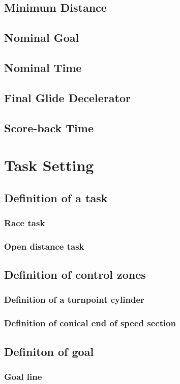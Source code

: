 \documentclass{article}
\begin{document}
\subsection{Minimum Distance}
\subsection{Nominal Goal}
\subsection{Nominal Time}
\subsection{Final Glide Decelerator}
\subsection{Score-back Time}

\newpage
\section{Task Setting}
\subsection{Definition of a task}
\subsubsection{Race task}
\subsubsection{Open distance task}
\subsection{Definition of control zones}
\subsubsection{Definition of a turnpoint cylinder}
\subsubsection{Definition of conical end of speed section}
\subsection{Definiton of goal}
\subsubsection{Goal line}
\end{document}
